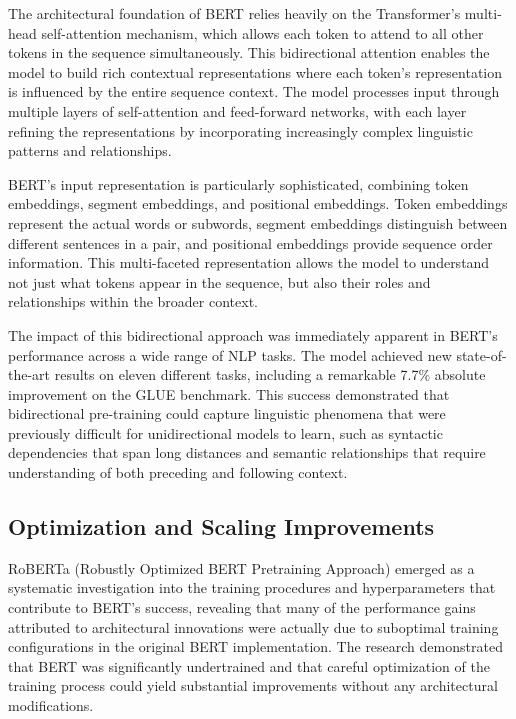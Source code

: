 \documentclass[
  titlepage]{article}
\begin{document}
The architectural foundation of BERT relies heavily on the Transformer's
multi-head self-attention mechanism, which allows each token to attend
to all other tokens in the sequence simultaneously. This bidirectional
attention enables the model to build rich contextual representations
where each token's representation is influenced by the entire sequence
context. The model processes input through multiple layers of
self-attention and feed-forward networks, with each layer refining the
representations by incorporating increasingly complex linguistic
patterns and relationships.

BERT's input representation is particularly sophisticated, combining
token embeddings, segment embeddings, and positional embeddings. Token
embeddings represent the actual words or subwords, segment embeddings
distinguish between different sentences in a pair, and positional
embeddings provide sequence order information. This multi-faceted
representation allows the model to understand not just what tokens
appear in the sequence, but also their roles and relationships within
the broader context.

The impact of this bidirectional approach was immediately apparent in
BERT's performance across a wide range of NLP tasks. The model achieved
new state-of-the-art results on eleven different tasks, including a
remarkable 7.7\% absolute improvement on the GLUE benchmark. This
success demonstrated that bidirectional pre-training could capture
linguistic phenomena that were previously difficult for unidirectional
models to learn, such as syntactic dependencies that span long distances
and semantic relationships that require understanding of both preceding
and following context.

\subsection{Optimization and Scaling
Improvements}\label{optimization-and-scaling-improvements}

RoBERTa (Robustly Optimized BERT Pretraining Approach) emerged as a
systematic investigation into the training procedures and
hyperparameters that contribute to BERT's success, revealing that many
of the performance gains attributed to architectural innovations were
actually due to suboptimal training configurations in the original BERT
implementation. The research demonstrated that BERT was significantly
undertrained and that careful optimization of the training process could
yield substantial improvements without any architectural modifications.
\end{document}
